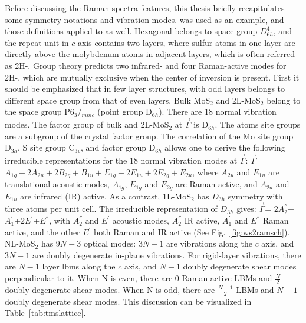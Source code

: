 Before discussing the Raman spectra features, this thesis briefly recapitulates some symmetry notations and vibration modes.  was used as an example, and those definitions applied to  as well. Hexagonal  belongs to space group $D_{6h}^4$, and the repeat unit in $c$ axis contains two layers, where sulfur atoms in one layer are directly above the molybdenum atoms in adjacent layers, which is often referred as 2H-. Group theory predicts two infrared- and four Raman-active modes for 2H-, which are mutually exclusive when the center of inversion is present. First it should be emphasized that in few layer structures,  with odd layers belongs to different space group from that of even layers. Bulk MoS$_2$ and 2L-MoS$_2$ belong to the space group P6$_3$/$_{mmc}$ (point group D$_{6h}$). There are 18 normal vibration modes. The factor group of bulk and 2L-MoS$_2$ at $\vec{\Gamma}$ is D$_{6h}$. The atoms site groups are a subgroup of the crystal factor group. The correlation of the Mo site group D$_{3h}$, S site group C$_{3v}$, and factor group D$_{6h}$ allows one to derive the following irreducible representations for the 18 normal vibration modes at $\vec{\Gamma}$: $\vec{\Gamma}$= $A_{1g}+2A_{2u}+2B_{2g}+B_{1u}+E_{1g}+2E_{1u}+2E_{2g}+E_{2u}$, where $A_{2u}$ and $E_{1u}$ are translational acoustic modes, $A_{1g}$, $E_{1g}$ and $E_{2g}$ are Raman active, and $A_{2u}$ and $E_{1u}$ are infrared (IR) active. As a contrast, 1L-MoS$_2$ has $D_{3h}$ symmetry with three atoms per unit cell. The irreducible representation of $D_{3h}$ gives: $\vec{\Gamma}$= $2A_2^{''}$+$A_1^{'}$+$2E^{'}$+$E^{''}$, with $A_2^{''}$ and $E^{'}$ acoustic modes, $A_2^{''}$ IR active, $A_1^{'}$ and $E^{''}$ Raman active, and the other $E^{'}$ both Raman and IR active (See Fig.~\ref{fig:ws2ramsch}). NL-MoS$_2$ has $9N-3$ optical modes: $3N-1$ are vibrations along the $c$ axis, and $3N-1$ are doubly degenerate in-plane vibrations. For rigid-layer vibrations, there are $N-1$ layer \glspl{lbm} along the $c$ axis, and $N-1$ doubly degenerate shear modes perpendicular to it. When N is even, there are 0 Raman active LBMs and $\frac{N}{2}$ doubly degenerate shear modes. When N is odd, there are $\frac{N-1}{2}$ LBMs and $N-1$ doubly degenerate shear modes.\cite{Wieting1971,Zhang2013e} This discussion can be visualized in Table~\ref{tab:tmslattice}.

